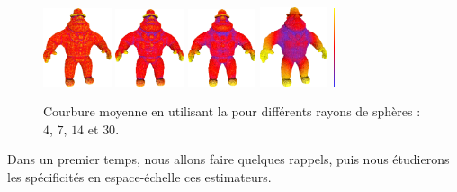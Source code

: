 \begin{figure}[ht]{
    \begin{center}
      \includegraphics[width=2cm]{images/Curvature/MeanAl_4}
      \includegraphics[width=2cm]{images/Curvature/MeanAl_7}
      \includegraphics[width=2cm]{images/Curvature/MeanAl_14}
      \includegraphics[width=2cm]{images/Curvature/MeanAl_30}
      \includegraphics[width=0.1cm,height=2.3cm]{images/YMTB6W}
    \end{center}}
    \caption{Courbure moyenne en utilisant la 
      pour différents rayons de sphères : $4$, $7$, $14$ et $30$.
      \label{fig:curvature-scale-3d}}
\end{figure}

Dans un premier temps, nous allons faire quelques rappels, puis nous étudierons
les spécificités en espace-échelle ces estimateurs.



